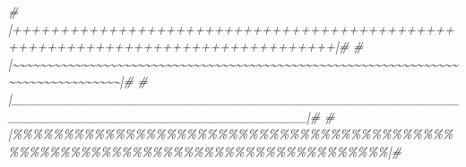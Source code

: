 \documentclass[
]{article}
\newenvironment{Shaded}{\begin{snugshade}}{\end{snugshade}}
\newcommand{\CommentTok}[1]{\textcolor[rgb]{0.56,0.35,0.01}{\textit{#1}}}
\begin{document}
\begin{Shaded}
\begin{Highlighting}[]
\CommentTok{\# |++++++++++++++++++++++++++++++++++++++++++++++++++++++++++++++++++++++++++++++++|\#}
\CommentTok{\# |\textasciitilde{}\textasciitilde{}\textasciitilde{}\textasciitilde{}\textasciitilde{}\textasciitilde{}\textasciitilde{}\textasciitilde{}\textasciitilde{}\textasciitilde{}\textasciitilde{}\textasciitilde{}\textasciitilde{}\textasciitilde{}\textasciitilde{}\textasciitilde{}\textasciitilde{}\textasciitilde{}\textasciitilde{}\textasciitilde{}\textasciitilde{}\textasciitilde{}\textasciitilde{}\textasciitilde{}\textasciitilde{}\textasciitilde{}\textasciitilde{}\textasciitilde{}\textasciitilde{}\textasciitilde{}\textasciitilde{}\textasciitilde{}\textasciitilde{}\textasciitilde{}\textasciitilde{}\textasciitilde{}\textasciitilde{}\textasciitilde{}\textasciitilde{}\textasciitilde{}\textasciitilde{}\textasciitilde{}\textasciitilde{}\textasciitilde{}\textasciitilde{}\textasciitilde{}\textasciitilde{}\textasciitilde{}\textasciitilde{}\textasciitilde{}\textasciitilde{}\textasciitilde{}\textasciitilde{}\textasciitilde{}\textasciitilde{}\textasciitilde{}\textasciitilde{}\textasciitilde{}\textasciitilde{}\textasciitilde{}\textasciitilde{}\textasciitilde{}\textasciitilde{}\textasciitilde{}\textasciitilde{}\textasciitilde{}\textasciitilde{}\textasciitilde{}\textasciitilde{}\textasciitilde{}\textasciitilde{}\textasciitilde{}\textasciitilde{}\textasciitilde{}\textasciitilde{}\textasciitilde{}\textasciitilde{}\textasciitilde{}\textasciitilde{}\textasciitilde{}|\#}
\CommentTok{\# |\_\_\_\_\_\_\_\_\_\_\_\_\_\_\_\_\_\_\_\_\_\_\_\_\_\_\_\_\_\_\_\_\_\_\_\_\_\_\_\_\_\_\_\_\_\_\_\_\_\_\_\_\_\_\_\_\_\_\_\_\_\_\_\_\_\_\_\_\_\_\_\_\_\_\_\_\_\_\_\_|\#}
\CommentTok{\# |\%\%\%\%\%\%\%\%\%\%\%\%\%\%\%\%\%\%\%\%\%\%\%\%\%\%\%\%\%\%\%\%\%\%\%\%\%\%\%\%\%\%\%\%\%\%\%\%\%\%\%\%\%\%\%\%\%\%\%\%\%\%\%\%\%\%\%\%\%\%\%\%\%\%\%\%\%\%\%\%|\#}
\end{Highlighting}
\end{Shaded}
\end{document}
